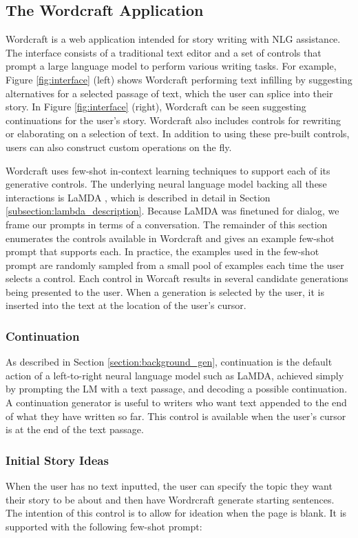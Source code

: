 \subsection{The Wordcraft Application}
\label{section:wordcraft_controls}
Wordcraft is a web application intended for story writing with NLG assistance.
The interface consists of a traditional text editor and a set of controls that prompt a large language model to perform various writing tasks.
For example, Figure \ref{fig:interface} (left) shows Wordcraft performing text infilling by suggesting alternatives for a selected passage of text, which the user can splice into their story.
In Figure \ref{fig:interface} (right), Wordcraft can be seen suggesting continuations for the user's story.
Wordcraft also includes controls for rewriting or elaborating on a selection of text. In addition to using these pre-built controls, users can also construct custom operations on the fly.

Wordcraft uses few-shot in-context learning techniques \cite{brown2020language} to support each of its generative controls.
The underlying neural language model backing all these interactions is LaMDA \cite{thoppilan2022lamda}, which is described in detail in Section \ref{subsection:lambda_description}.
Because LaMDA was finetuned for dialog, we frame our prompts in terms of a conversation.
The remainder of this section enumerates the controls available in Wordcraft and gives an example few-shot prompt that supports each.
In practice, the examples used in the few-shot prompt are randomly sampled from a small pool of examples each time the user selects a control.
Each control in Worcaft results in several candidate generations being presented to the user.
When a generation is selected by the user, it is inserted into the text at the location of the user's cursor.


\subsubsection{Continuation}
As described in Section \ref{section:background_gen}, continuation is the default action of a left-to-right neural language model such as LaMDA, achieved simply by prompting the LM with a text passage, and decoding a possible continuation.
A continuation generator is useful to writers who want text appended to the end of what they have written so far.
This control is available when the user's cursor is at the end of the text passage.

\subsubsection{Initial Story Ideas}
When the user has no text inputted, the user can specify the topic they want their story to be about and then have Wordrcraft generate starting sentences.
The intention of this control is to allow for ideation when the page is blank.
It is supported with the following few-shot prompt:


